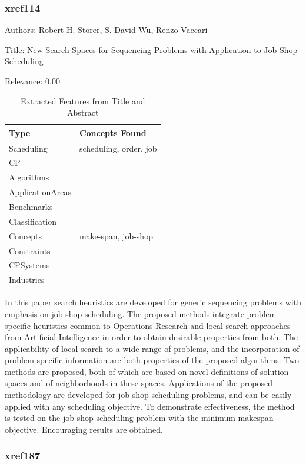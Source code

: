 \subsubsection{xref114}
\label{mw:xref114}

Authors: Robert H. Storer, S. David Wu, Renzo Vaccari

Title: New Search Spaces for Sequencing Problems with Application to Job Shop Scheduling

Relevance:  0.00

{\scriptsize
\begin{longtable}{p{2cm}p{20cm}}
\caption{Extracted Features from Title and Abstract}\\ \toprule
Type & Concepts Found\\ \midrule
\endhead
\bottomrule
\endfoot
Scheduling & scheduling, order, job\\ 
CP & \\ 
Algorithms & \\ 
ApplicationAreas & \\ 
Benchmarks & \\ 
Classification & \\ 
Concepts & make-span, job-shop\\ 
Constraints & \\ 
CPSystems & \\ 
Industries & \\ 
\end{longtable}
}

  In this paper search heuristics are developed for generic sequencing problems with emphasis on job shop scheduling. The proposed methods integrate problem specific heuristics common to Operations Research and local search approaches from Artificial Intelligence in order to obtain desirable properties from both. The applicability of local search to a wide range of problems, and the incorporation of problem-specific information are both properties of the proposed algorithms. Two methods are proposed, both of which are based on novel definitions of solution spaces and of neighborhoods in these spaces. Applications of the proposed methodology are developed for job shop scheduling problems, and can be easily applied with any scheduling objective. To demonstrate effectiveness, the method is tested on the job shop scheduling problem with the minimum makespan objective. Encouraging results are obtained.  

\subsubsection{xref187}
\label{mw:xref187}

